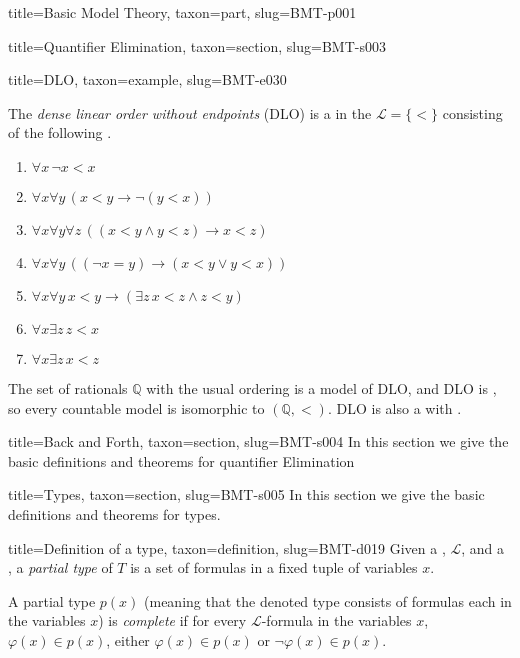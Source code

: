 \documentclass[a4paper]{article}
\begin{document}
\begin{tree}{title={Basic Model Theory}, taxon={part}, slug={BMT-p001}}
\begin{tree}{title={Quantifier Elimination}, taxon={section}, slug={BMT-s003}}
  
  
\begin{tree}{title={DLO}, taxon={example}, slug={BMT-e030}}

    The \emph{dense linear order without endpoints} (DLO) is a  in the  \(\mathcal  L= \{ < \}\)
    consisting of the following .
    \begin{enumerate}
\item{\(\forall  x \, \neg  x<x\)}
        \item{\(\forall  x \forall  y \, (x<y \rightarrow \neg (y<x))\)}
        \item{\(\forall  x \forall  y \forall  z \, ((x<y \land  y<z) \rightarrow  x<z)\)}
        \item{\(\forall  x \forall  y \, (( \neg  x=y) \rightarrow (x<y \lor  y<x))\)}
        \item{\(\forall  x \forall  y \, x<y \rightarrow ( \exists  z \, x<z \land  z<y)\)}
        \item{\(\forall  x \exists  z \, z<x\)}
        \item{\(\forall  x \exists  z \, x<z\)}
\end{enumerate}\par{
    The set of rationals \(\mathbb  Q\) with the usual ordering is a model of DLO, and DLO is ,
    so every countable model is isomorphic to \(( \mathbb  Q,<)\). DLO is also a  with
    .
}
\end{tree}


\end{tree}


  
  
\begin{tree}{title={Back and Forth}, taxon={section}, slug={BMT-s004}}
In this section we give the basic definitions and theorems for quantifier Elimination
\end{tree}


  
  
\begin{tree}{title={Types}, taxon={section}, slug={BMT-s005}}
In this section we give the basic definitions and theorems for types.
\begin{tree}{title={Definition of a type}, taxon={definition}, slug={BMT-d019}}
Given a , \(\mathcal {L}\), and a , a \emph{partial type} of \(T\) is a  set of formulas in a fixed tuple of variables \(x\).\par{A partial type \(p(x)\) (meaning that the denoted type consists of formulas each in the variables \(x\)) is \emph{complete} if for every \(\mathcal {L}\)-formula in the variables \(x\), \(\varphi (x) \in  p(x)\), either \(\varphi (x) \in  p(x)\) or \(\neg   \varphi (x) \in  p(x)\).}
\end{tree}


\end{tree}
\end{tree}
\end{document}
